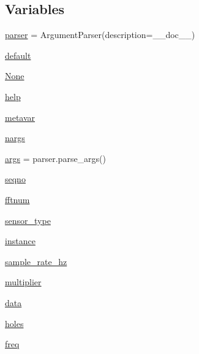 \subsection*{Variables}
\begin{DoxyCompactItemize}
\item 
\mbox{\hyperlink{namespacepymavlink_1_1tools_1_1mavfft__isb_a285032cf32ae22db0f1852160a9b106d}{parser}} = Argument\+Parser(description=\+\_\+\+\_\+doc\+\_\+\+\_\+)
\item 
\mbox{\hyperlink{namespacepymavlink_1_1tools_1_1mavfft__isb_a9785b8130b07e82de2577f2319866d47}{default}}
\item 
\mbox{\hyperlink{namespacepymavlink_1_1tools_1_1mavfft__isb_af22ce38b86c7d55eb23f76e7ef0921d3}{None}}
\item 
\mbox{\hyperlink{namespacepymavlink_1_1tools_1_1mavfft__isb_a41dc388e80d45ae80e937a56ff443333}{help}}
\item 
\mbox{\hyperlink{namespacepymavlink_1_1tools_1_1mavfft__isb_a568275732160c52c35f4de538ba3d9cf}{metavar}}
\item 
\mbox{\hyperlink{namespacepymavlink_1_1tools_1_1mavfft__isb_a28f4c3ef424b32bd13b25d113eb9641c}{nargs}}
\item 
\mbox{\hyperlink{namespacepymavlink_1_1tools_1_1mavfft__isb_ad748dda4c0238e001008473041b7f443}{args}} = parser.\+parse\+\_\+args()
\item 
\mbox{\hyperlink{namespacepymavlink_1_1tools_1_1mavfft__isb_a423d01182e4f67cce9807144127f51d1}{seqno}}
\item 
\mbox{\hyperlink{namespacepymavlink_1_1tools_1_1mavfft__isb_a0e210b25f3b204b551d5f4aff6c94cc7}{fftnum}}
\item 
\mbox{\hyperlink{namespacepymavlink_1_1tools_1_1mavfft__isb_a9304eb94543bc59e1f24d4b852179ecb}{sensor\+\_\+type}}
\item 
\mbox{\hyperlink{namespacepymavlink_1_1tools_1_1mavfft__isb_a99d4de1b363e26a62ca50f6592db22f4}{instance}}
\item 
\mbox{\hyperlink{namespacepymavlink_1_1tools_1_1mavfft__isb_acbfbbd93fab61553c0cc7c7caae5cbec}{sample\+\_\+rate\+\_\+hz}}
\item 
\mbox{\hyperlink{namespacepymavlink_1_1tools_1_1mavfft__isb_a8093799626ab8ed656a2dbc95e410cdf}{multiplier}}
\item 
\mbox{\hyperlink{namespacepymavlink_1_1tools_1_1mavfft__isb_a8b5746530e8ca6acc2a5c1f418c731e2}{data}}
\item 
\mbox{\hyperlink{namespacepymavlink_1_1tools_1_1mavfft__isb_a2b676d6c3c71b3e8d7bc70fb7bc122ee}{holes}}
\item 
\mbox{\hyperlink{namespacepymavlink_1_1tools_1_1mavfft__isb_a0962f77b7463ff532624de1f0b521018}{freq}}
\end{DoxyCompactItemize}


